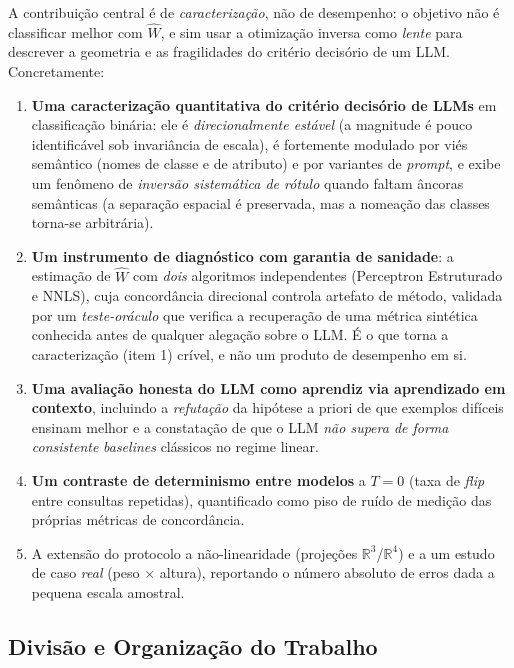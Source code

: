 \documentclass[12pt,a4paper]{article}
\newcommand{\West}{\ensuremath{\hat{W}}}   %
\begin{document}
A contribuição central é de \emph{caracterização}, não de desempenho: o objetivo não é
classificar melhor com \West{}, e sim usar a otimização inversa como \emph{lente} para
descrever a geometria e as fragilidades do critério decisório de um LLM. Concretamente:

\begin{enumerate}
  \item \textbf{Uma caracterização quantitativa do critério decisório de LLMs} em
    classificação binária: ele é \emph{direcionalmente estável} (a magnitude é pouco
    identificável sob invariância de escala),
    é fortemente modulado por viés semântico (nomes de classe e de atributo) e por
    variantes de \emph{prompt}, e exibe um fenômeno de \emph{inversão sistemática de rótulo}
    quando faltam âncoras semânticas (a separação espacial é preservada, mas a nomeação das
    classes torna-se arbitrária).
  \item \textbf{Um instrumento de diagnóstico com garantia de sanidade}: a estimação de
    \West{} com \emph{dois} algoritmos independentes (Perceptron Estruturado e NNLS), cuja
    concordância direcional controla artefato de método, validada por um \emph{teste-oráculo}
    que verifica a recuperação de uma métrica sintética conhecida antes de qualquer alegação
    sobre o LLM. É o que torna a caracterização (item 1) crível, e não um produto de
    desempenho em si.
  \item \textbf{Uma avaliação honesta do LLM como aprendiz via aprendizado em contexto},
    incluindo a
    \emph{refutação} da hipótese a priori de que exemplos difíceis ensinam melhor e a
    constatação de que o LLM \emph{não supera de forma consistente} \emph{baselines}
    clássicos no
    regime linear.
  \item \textbf{Um contraste de determinismo entre modelos} a $T=0$ (taxa de \emph{flip}
    entre consultas repetidas), quantificado como piso de ruído de medição das próprias
    métricas de concordância.
  \item A extensão do protocolo a não-linearidade (projeções $\mathbb{R}^3$/$\mathbb{R}^4$)
    e a um estudo de
    caso \emph{real} (peso $\times$ altura), reportando o número absoluto de erros dada a
    pequena escala amostral.
\end{enumerate}

\subsection*{Divisão e Organização do Trabalho}
\end{document}
